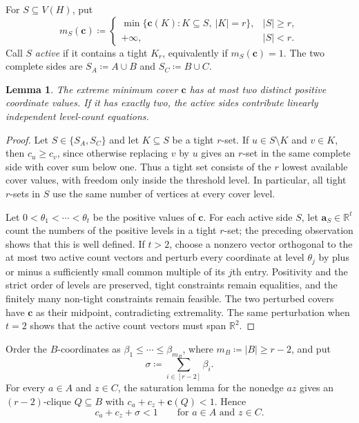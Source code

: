 \documentclass[10pt]{article}
\numberwithin{equation}{section}
\newtheorem{lemma}[lemma]{Lemma}
\newcommand{\vct}[1]{\boldsymbol{#1}}
\newcommand{\R}{\mathbb R}
\begin{document}
For $S\subseteq V(H)$, put
\[
 m_S(\vct c)\coloneqq
 \begin{cases}
  \min\{\vct c(K)\colon K\subseteq S,\ |K|=r\},&|S|\ge r,\\
  +\infty,&|S|<r.
 \end{cases}
\]
Call $S$ \emph{active} if it contains a tight $K_r$, equivalently if $m_S(\vct c)=1$.  The two complete sides are $S_A\coloneqq A\cup B$ and $S_C\coloneqq B\cup C$.

\begin{lemma}\label{lem:weighted-two-level}
The extreme minimum cover $\vct c$ has at most two distinct positive coordinate values.  If it has exactly two, the active sides contribute linearly independent level-count equations.
\end{lemma}

\begin{proof}
Let $S\in\{S_A,S_C\}$ and let $K\subseteq S$ be a tight $r$-set.  If $u\in S\setminus K$ and $v\in K$, then $c_u\ge c_v$, since otherwise replacing $v$ by $u$ gives an $r$-set in the same complete side with cover sum below one.  Thus a tight set consists of the $r$ lowest available cover values, with freedom only inside the threshold level.  In particular, all tight $r$-sets in $S$ use the same number of vertices at every cover level.

Let $0<\theta_1<\cdots<\theta_t$ be the positive values of $\vct c$.  For each active side $S$, let $\vct a_S\in\R^t$ count the numbers of the positive levels in a tight $r$-set; the preceding observation shows that this is well defined.  If $t>2$, choose a nonzero vector orthogonal to the at most two active count vectors and perturb every coordinate at level $\theta_j$ by plus or minus a sufficiently small common multiple of its $j$th entry.  Positivity and the strict order of levels are preserved, tight constraints remain equalities, and the finitely many non-tight constraints remain feasible.  The two perturbed covers have $\vct c$ as their midpoint, contradicting extremality.  The same perturbation when $t=2$ shows that the active count vectors must span $\R^2$.
\end{proof}

Order the $B$-coordinates as $\beta_1\le\cdots\le\beta_{m_B}$, where $m_B\coloneqq|B|\ge r-2$, and put
\begin{equation}\label{eq:sigma-light-B}
 \sigma\coloneqq\sum_{i\in[r-2]}\beta_i.
\end{equation}
For every $a\in A$ and $z\in C$, the saturation lemma for the nonedge $az$ gives an $(r-2)$-clique $Q\subseteq B$ with $c_a+c_z+\vct c(Q)<1$.  Hence
\begin{equation}\label{eq:end-saturation-inequality}
 c_a+c_z+\sigma<1
 \qquad\text{for }a\in A\text{ and }z\in C.
\end{equation}
\end{document}
